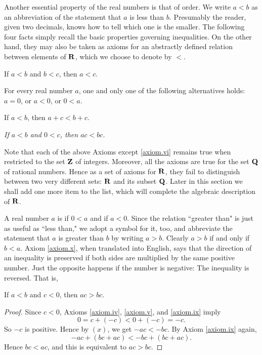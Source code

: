 Another essential property of the real numbers is that of order.
We write $a < b$
as an abbreviation of the statement that $a$ is less than $b$.
Presumably the reader, given two decimals,
knows how to tell which one is the smaller.
The following four facts simply recall
the basic properties governing inequalities.
On the other hand,
they may also be taken as axioms for an abstractly defined relation
between elements of $\mathrm{\bf R}$,
which we choose to denote by $<$.
 
\begin{axiom}
\label{axiom.vii}
If $a < b$ and $b < c$, then $a < c$.
\end{axiom}

\begin{axiom}
\label{axiom.viii}
For every real number $a$,
one and only one of the following alternatives holds:
$a = 0$, or $a < 0$, or $0 < a$.
\end{axiom}

\begin{axiom}
\label{axiom.ix}
If $a < b$, then $a + c < b + c$.
\end{axiom}

\begin{axiom}
\label{axiom.x}
\emph{If $a < b$ and $0 < c$, then $ac < bc$.}
\end{axiom}
 
Note that each of the above Axioms except \ref{axiom.vi}
remains true when restricted to the set $\mathrm{\bf Z}$ of integers.
Moreover,
all the axioms are true for the set $\mathrm{\bf Q}$ of rational numbers.
Hence as a set of axioms for $\mathrm{\bf R}$,
they fail to distinguish between two very different sets:
$\mathrm{\bf R}$ and its subset $\mathrm{\bf Q}$.
Later in this section we shall add one more item to the list,
which will complete the algebraic description of $\mathrm{\bf R}$.

A real number $a$ is if  $0 < a$
and  if $a < 0$.
Since the relation ``greater than" is just as useful as ``less than,"
we adopt a symbol for it, too,
and abbreviate the statement that $a$ is greater than $b$
by writing $a > b$.
Clearly $a > b$ if and only if $b < a$.
Axiom \ref{axiom.x},
when translated into English,
says that the direction of an inequality is preserved
if both sides are multiplied by the same positive number.
Just the opposite happens if the number is negative:
The inequality is reversed.
That is,

\begin{prop}
\label{thm 1.1.1}
If $a < b$  and  $c < 0$, then $ac > bc$.
\end{prop}
\begin{proof}
Since $c < 0$, Axioms
\ref{axiom.iv},
\ref{axiom.v},
and
\ref{axiom.ix}
imply
\[
0 = c + (-c) < 0 + (- c) = - c
.
\]
So $-c$ is positive.
Hence by $(x)$, we get $-ac < -bc$.
By Axiom
\ref{axiom.ix}
again, 
\[
-ac + (bc + ac) < -bc + (bc + ac).
\]
Hence $bc < ac$,
and this is equivalent to $ac > bc$.
\end{proof}

